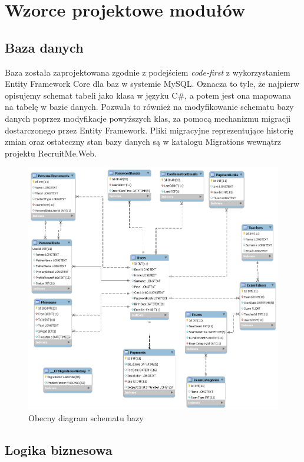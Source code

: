 \documentclass{article}
\begin{document}
\section{Wzorce projektowe modułów}
\subsection{Baza danych}
Baza została zaprojektowana zgodnie z podejściem \emph{code-first} z wykorzystaniem Entity Framework Core dla baz w systemie MySQL. Oznacza to tyle, że najpierw opisujemy schemat tabeli jako klasa w języku C\#, a potem jest ona mapowana na tabelę w bazie danych. Pozwala to również na modyfikowanie schematu bazy danych poprzez modyfikacje powyższych klas, za pomocą mechanizmu migracji dostarczonego przez Entity Framework. Pliki migracyjne reprezentujące historię zmian oraz ostateczny stan bazy danych są w katalogu Migrations wewnątrz projektu RecruitMe.Web.

\begin{figure}[H]
\centering
\includegraphics[scale=0.35]{images/model.png}
\caption{Obecny diagram schematu bazy}
\end{figure}

\subsection{Logika biznesowa}
\end{document}
